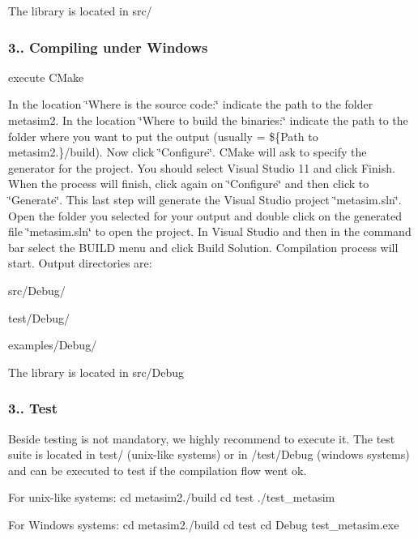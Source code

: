 The library is located in src/

\subsubsection*{3.. Compiling under Windows}

\begin{DoxyVerb}execute CMake
\end{DoxyVerb}


In the location \char`\"{}\+Where is the source code\+:\char`\"{} indicate the path to the folder metasim2. In the location \char`\"{}\+Where to build the binaries\+:\char`\"{} indicate the path to the folder where you want to put the output (usually = \$\{Path to metasim2.\}/build). Now click \char`\"{}\+Configure\char`\"{}. C\+Make will ask to specify the generator for the project. You should select Visual Studio 11 and click Finish. When the process will finish, click again on \char`\"{}\+Configure\char`\"{} and then click to \char`\"{}\+Generate\char`\"{}. This last step will generate the Visual Studio project \char`\"{}metasim.\+sln\char`\"{}. Open the folder you selected for your output and double click on the generated file \char`\"{}metasim.\+sln\char`\"{} to open the project. In Visual Studio and then in the command bar select the B\+U\+I\+LD menu and click Build Solution. Compilation process will start. Output directories are\+:
\begin{DoxyItemize}
\item src/\+Debug/
\item test/\+Debug/
\item examples/\+Debug/
\end{DoxyItemize}

The library is located in src/\+Debug

\subsubsection*{3.. Test}

Beside testing is not mandatory, we highly recommend to execute it. The test suite is located in test/ (unix-\/like systems) or in /test/\+Debug (windows systems) and can be executed to test if the compilation flow went ok.


\begin{DoxyItemize}
\item For unix-\/like systems\+: cd metasim2./build cd test ./test\+\_\+metasim
\item For Windows systems\+: cd metasim2./build cd test cd Debug test\+\_\+metasim.\+exe
\end{DoxyItemize}

